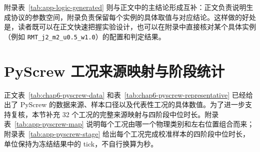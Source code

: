\documentclass[master,fontset=ubuntu]{shnuthesis}
\theoremstyle{definition}
\begin{document}
附录表~\ref{tab:app-logic-generated} 则与正文中的主结论形成互补：正文负责说明生成协议的参数空间，附录负责保留每个实例的具体取值与对应结论。这样做的好处是，读者既可以在正文快速把握实验设计，也可以在附录中直接核对某个具体实例（例如 \texttt{RMT\_j2\_m2\_u0.5\_w1.0}）的配置和判定结果。

\section{PyScrew 工况来源映射与阶段统计}

正文表~\ref{tab:chap6-pyscrew-data} 和表~\ref{tab:chap6-pyscrew-representative} 已经给出了 PyScrew 的数据来源、样本口径以及代表性工况的具体数值。为了进一步支持复核，本节补充 32 个工况的完整来源映射与四阶段中位时长。附录表~\ref{tab:app-pyscrew-map} 说明每个工况由哪一个物理类别和左右位置组合而来；附录表~\ref{tab:app-pyscrew-stage} 给出每个工况完成校准样本的四阶段中位时长，单位保持为冻结结果中的 tick，不自行换算为秒。
\end{document}
